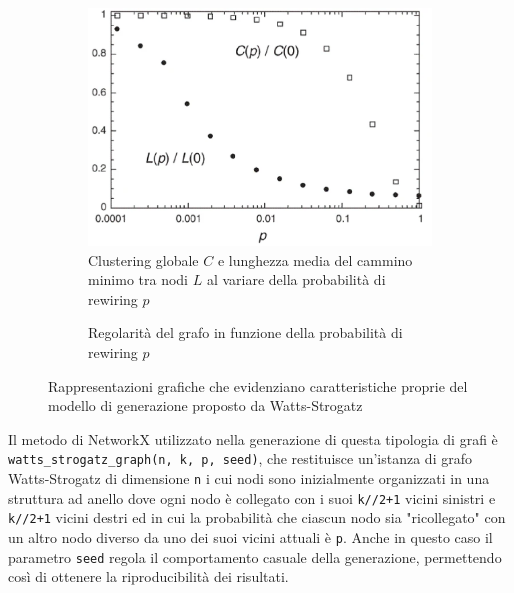 \begin{figure}[h!]
     \centering
     \begin{subfigure}[t]{7cm}
         \includegraphics[width=\columnwidth]{images/wsgcl.eps}
         \caption{Clustering globale $C$ e lunghezza media del cammino minimo tra nodi $L$ al variare della probabilità di rewiring $p$}
          \label{fig:lcwsg}
     \end{subfigure}
     \hspace{0.8em}
     \begin{subfigure}[t]{7cm}
         \caption{Regolarità del grafo in funzione della probabilità di rewiring $p$}
          \label{fig:incwsg}
     \end{subfigure}
        \caption{Rappresentazioni grafiche che evidenziano caratteristiche proprie del modello di generazione proposto da Watts-Strogatz \cite{watts_collective_1998}}
\end{figure}

Il metodo di NetworkX utilizzato nella generazione di questa tipologia di grafi è \linebreak
\texttt{watts\_strogatz\_graph(n, k, p, seed)}, che restituisce un'istanza di grafo Watts-Strogatz di dimensione \texttt{n} i cui nodi sono inizialmente organizzati in una struttura ad anello dove ogni nodo è collegato con i suoi \texttt{k//2+1} vicini sinistri e \texttt{k//2+1} vicini destri ed in cui la probabilità che ciascun nodo sia "ricollegato" con un altro nodo diverso da uno dei suoi vicini attuali è \texttt{p}. Anche in questo caso il parametro \texttt{seed} regola il comportamento casuale della generazione, permettendo così di ottenere la riproducibilità dei risultati.

